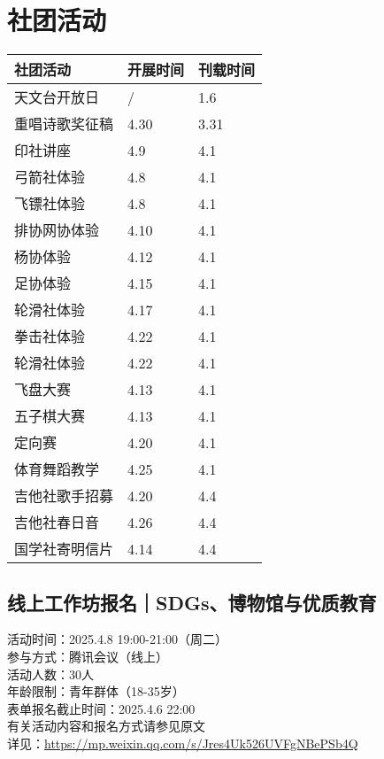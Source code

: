\documentclass[letterpaper, 12pt]{article}
\begin{document}
\begin{multicols}{2}
\begin{tabular}{|>{\centering\arraybackslash}m{}|m{}|m{}|}
    \hline
\end{tabular}

\section{社团活动}
\begin{tabular}{|>{\centering\arraybackslash}m{}|m{}|m{}|}
    \hline
    社团活动 & 开展时间 & 刊载时间\\
    \hline\hline
    天文台开放日 & / & 1.6\\
    重唱诗歌奖征稿 & 4.30 & 3.31\\
    印社讲座 & 4.9 & 4.1\\
    弓箭社体验 & 4.8 & 4.1\\
    飞镖社体验 & 4.8 & 4.1\\
    排协网协体验 & 4.10 & 4.1\\
    杨协体验 & 4.12 & 4.1\\
    足协体验 & 4.15 & 4.1\\
    轮滑社体验 & 4.17 & 4.1\\
    拳击社体验 & 4.22 & 4.1\\
    轮滑社体验 & 4.22 & 4.1\\
    飞盘大赛 & 4.13 & 4.1\\
    五子棋大赛 & 4.13 & 4.1\\
    定向赛 & 4.20 & 4.1\\
    体育舞蹈教学 & 4.25 & 4.1\\
    吉他社歌手招募 & 4.20 & 4.4\\
    吉他社春日音 & 4.26 & 4.4\\
    国学社寄明信片 & 4.14 & 4.4\\
    \hline
\end{tabular}

\subsection{线上工作坊报名｜SDGs、博物馆与优质教育}
活动时间：2025.4.8  19:00-21:00（周二）
\\参与方式：腾讯会议（线上）
\\活动人数：30人
\\年龄限制：青年群体（18-35岁）
\\表单报名截止时间：2025.4.6 22:00
\\有关活动内容和报名方式请参见原文
\\详见：\url{https://mp.weixin.qq.com/s/Jres4Uk526UVFgNBePSb4Q}



\end{multicols}
\end{document}
